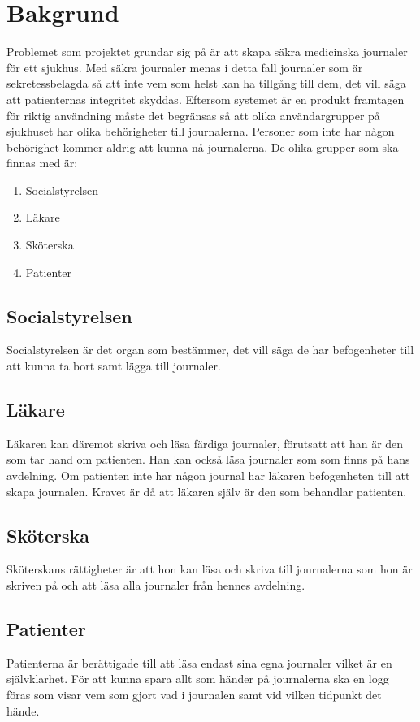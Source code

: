 \section{Bakgrund}

Problemet som projektet grundar sig på är att skapa säkra medicinska journaler för ett sjukhus. Med säkra journaler menas i detta fall journaler som är sekretessbelagda så att inte vem som helst kan ha tillgång till dem, det vill säga att patienternas integritet skyddas. Eftersom systemet är en produkt framtagen för riktig användning måste det begränsas så att olika användargrupper på sjukhuset har olika behörigheter till journalerna. Personer som inte har någon behörighet kommer aldrig att kunna nå journalerna. De olika grupper som ska finnas med är:

\begin{enumerate}
\item{Socialstyrelsen}
\item{Läkare}
\item{Sköterska}
\item{Patienter}
\end{enumerate} 


\subsection{Socialstyrelsen}
Socialstyrelsen är det organ som bestämmer, det vill säga de har befogenheter till att kunna ta bort samt lägga till journaler. 

\subsection{Läkare}
Läkaren kan däremot skriva och läsa färdiga journaler, förutsatt att han är den som tar hand om patienten. Han kan också läsa journaler som som finns på hans avdelning. Om patienten inte har någon journal har läkaren befogenheten till att skapa journalen. Kravet är då att läkaren själv är den som behandlar patienten.

\subsection{Sköterska}
Sköterskans rättigheter är att hon kan läsa och skriva till journalerna som hon är skriven på och att läsa alla journaler från hennes avdelning.

\subsection{Patienter}
Patienterna är berättigade till att läsa endast sina egna journaler vilket är en självklarhet.
För att kunna spara allt som händer på journalerna ska en logg föras som visar vem som gjort vad i journalen samt vid vilken tidpunkt det hände.
